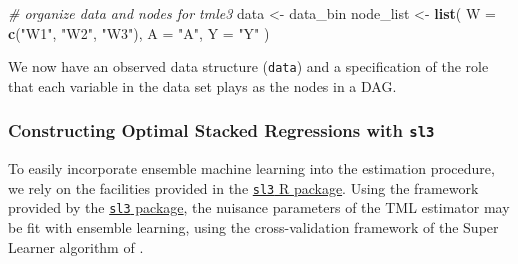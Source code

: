 \documentclass[12pt, krantz2,]{krantz}
\newenvironment{Shaded}{\begin{snugshade}}{\end{snugshade}}
\newcommand{\CommentTok}[1]{\textcolor[rgb]{0.37,0.37,0.37}{\textit{#1}}}
\newcommand{\DataTypeTok}[1]{\textcolor[rgb]{0.27,0.27,0.27}{#1}}
\newcommand{\KeywordTok}[1]{\textcolor[rgb]{0.27,0.27,0.27}{\textbf{#1}}}
\newcommand{\NormalTok}[1]{#1}
\newcommand{\StringTok}[1]{\textcolor[rgb]{0.5,0.5,0.5}{#1}}
\theoremstyle{definition}
\theoremstyle{definition}
\theoremstyle{definition}
\newcommand{\1}{\mathbbm{1}}
\begin{document}
\begin{Shaded}
\begin{Highlighting}[]
\CommentTok{# organize data and nodes for tmle3}
\NormalTok{data <-}\StringTok{ }\NormalTok{data_bin}
\NormalTok{node_list <-}\StringTok{ }\KeywordTok{list}\NormalTok{(}
  \DataTypeTok{W =} \KeywordTok{c}\NormalTok{(}\StringTok{"W1"}\NormalTok{, }\StringTok{"W2"}\NormalTok{, }\StringTok{"W3"}\NormalTok{),}
  \DataTypeTok{A =} \StringTok{"A"}\NormalTok{,}
  \DataTypeTok{Y =} \StringTok{"Y"}
\NormalTok{)}
\end{Highlighting}
\end{Shaded}

We now have an observed data structure (\texttt{data}) and a specification of the role
that each variable in the data set plays as the nodes in a DAG.

\hypertarget{constructing-optimal-stacked-regressions-with-sl3}{%
\subsubsection{\texorpdfstring{Constructing Optimal Stacked Regressions with \texttt{sl3}}{Constructing Optimal Stacked Regressions with sl3}}\label{constructing-optimal-stacked-regressions-with-sl3}}

To easily incorporate ensemble machine learning into the estimation procedure,
we rely on the facilities provided in the \href{https://tlverse.org/sl3}{\texttt{sl3} R
package}. Using the framework provided by the \href{https://tlverse.org/sl3}{\texttt{sl3}
package}, the nuisance parameters of the TML estimator
may be fit with ensemble learning, using the cross-validation framework of the
Super Learner algorithm of \citet{vdl2007super}.
\end{document}
